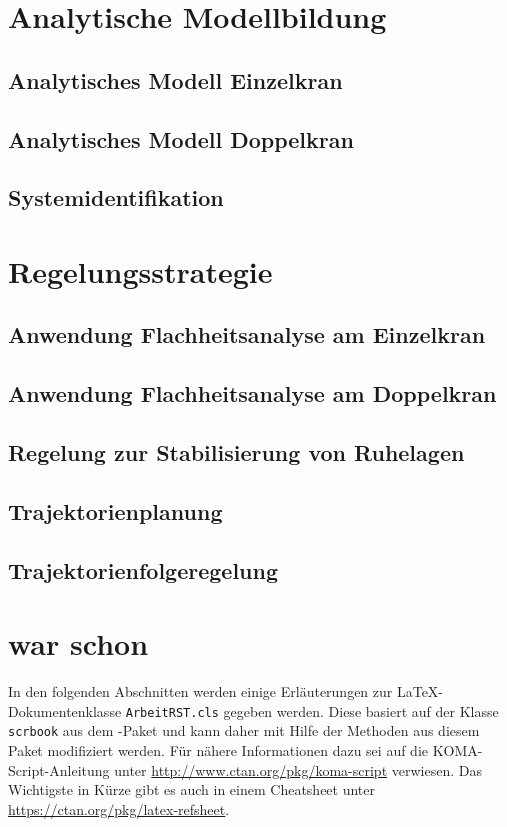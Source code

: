 \chapter{Analytische Modellbildung}
\section{Analytisches Modell Einzelkran}

\section{Analytisches Modell Doppelkran}

\section{Systemidentifikation}


\chapter{Regelungsstrategie}
\section{Anwendung Flachheitsanalyse am Einzelkran}

\section{Anwendung Flachheitsanalyse am Doppelkran}

\section{Regelung zur Stabilisierung von Ruhelagen}

\section{Trajektorienplanung}

\section{Trajektorienfolgeregelung}

\chapter{war schon}
In den folgenden Abschnitten werden einige Erläuterungen zur \LaTeX-Dokumentenklasse \texttt{ArbeitRST.cls} gegeben werden. Diese basiert auf der Klasse \texttt{scrbook} aus dem \KOMAScript-Paket und kann daher mit Hilfe der Methoden aus diesem Paket modifiziert werden. Für nähere Informationen dazu sei auf die KOMA-Script-Anleitung unter \url{http://www.ctan.org/pkg/koma-script} verwiesen. Das Wichtigste in Kürze gibt es auch in einem Cheatsheet unter \url{https://ctan.org/pkg/latex-refsheet}.

